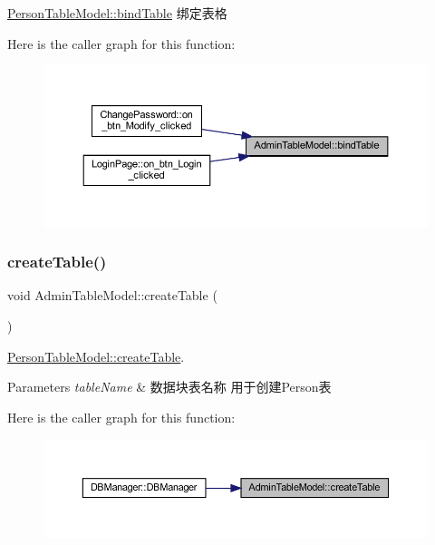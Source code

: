 \mbox{\hyperlink{class_person_table_model_a4abbde77bb6256c11d464d59c77878e4}{Person\+Table\+Model\+::bind\+Table}} 绑定表格 

Here is the caller graph for this function\+:
\nopagebreak
\begin{figure}[H]
\begin{center}
\leavevmode
\includegraphics[width=350pt]{class_admin_table_model_a8f24c9bdafcd7d3b4f668b8893d64b59_icgraph}
\end{center}
\end{figure}
\mbox{\label{class_admin_table_model_a221d30635e1a6f55fcfbf241108636df}} 
\subsubsection{\texorpdfstring{createTable()}{createTable()}}
{\footnotesize\ttfamily void Admin\+Table\+Model\+::create\+Table (\begin{DoxyParamCaption}{ }\end{DoxyParamCaption})}



\mbox{\hyperlink{class_person_table_model_a121018cb2905e38572a05c457e9fda35}{Person\+Table\+Model\+::create\+Table}}. 


\begin{DoxyParams}{Parameters}
{\em table\+Name} & 数据块表名称 用于创建\+Person表 \\
\hline
\end{DoxyParams}
Here is the caller graph for this function\+:
\nopagebreak
\begin{figure}[H]
\begin{center}
\leavevmode
\includegraphics[width=350pt]{class_admin_table_model_a221d30635e1a6f55fcfbf241108636df_icgraph}
\end{center}
\end{figure}
\mbox{\label{class_admin_table_model_a951c5e298d36e8451a13c63711933b5e}} 
